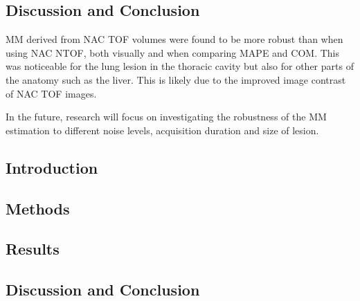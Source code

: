         \subsection{Discussion and Conclusion} \label{sec:impact_of_tof_on_respiratory_motion_modelling_using_nac_pet_discussion_and_conclusion}
            \gls{MM} derived from \gls{NAC} \gls{TOF} volumes were found to be more robust than when using \gls{NAC} \gls{NTOF}, both visually and when comparing \gls{MAPE} and \gls{COM}. This was noticeable for the lung lesion in the thoracic cavity but also for other parts of the anatomy such as the liver. This is likely due to the improved image contrast of \gls{NAC} \gls{TOF} images.

            In the future, research will focus on investigating the robustness of the \gls{MM} estimation to different noise levels, acquisition duration and size of lesion.
    
        
        
        \subsection{Introduction} \label{sec:extension_of_nac_tof_pet_motion_modelling_to_inter_and_intra_respiratory_cycle_variation_introduction}
        
        \subsection{Methods} \label{sec:extension_of_nac_tof_pet_motion_modelling_to_inter_and_intra_respiratory_cycle_variation_methods}
            
            
        \subsection{Results} \label{sec:extension_of_nac_tof_pet_motion_modelling_to_inter_and_intra_respiratory_cycle_variation_results}
            
            
        \subsection{Discussion and Conclusion} \label{sec:extension_of_nac_tof_pet_motion_modelling_to_inter_and_intra_respiratory_cycle_variation_discussion_and_conclusion}
            
            